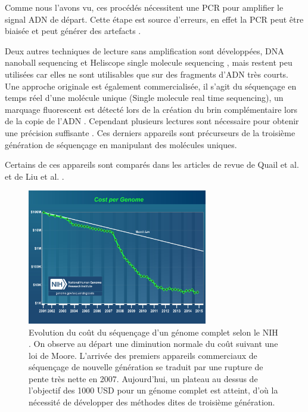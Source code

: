 Comme nous l'avons vu, ces procédés nécessitent une PCR pour amplifier le signal ADN de départ. Cette étape est source d'erreurs, en effet la PCR peut être biaisée et peut générer des artefacts \cite{Acinas2005}.



Deux autres techniques de lecture sans amplification sont développées, DNA nanoball sequencing \cite{Porreca2010} et Heliscope single molecule sequencing \cite{pmid20890904}, mais restent peu utilisées car elles ne sont utilisables que sur des fragments d'ADN très courts. Une approche originale est également commercialisée, il s'agit du séquençage en temps réel d'une molécule unique (Single molecule real time sequencing), un marquage fluorescent est détecté lors de la création du brin complémentaire lors de la copie de l'ADN \cite{Eid2009}. Cependant plusieurs lectures sont nécessaire pour obtenir une précision suffisante \cite{Chin2013}. Ces derniers appareils sont précurseurs de la troisième génération de séquençage en manipulant des molécules uniques.



Certains de ces appareils sont comparés dans les articles de revue de Quail et al. \cite{Quail2012} et de Liu et al. \cite{Liu2012}. 

\begin{figure}[H]
\begin{center}
\includegraphics[width=0.7\textwidth]{cost_genome.jpg}

\caption[Coût du séquençage]{Evolution du coût du séquençage d'un génome complet selon le NIH \cite{adncost}. On observe au départ une diminution normale du coût suivant une loi de Moore. L'arrivée des premiers appareils commerciaux de séquençage de nouvelle génération se traduit par une rupture de pente très nette en 2007. Aujourd'hui, un plateau au dessus de l'objectif des 1000 USD pour un génome complet est atteint, d'où la nécessité de développer des méthodes dites de troisième génération.}
\label{seqcost}
\end{center}
\end{figure}


